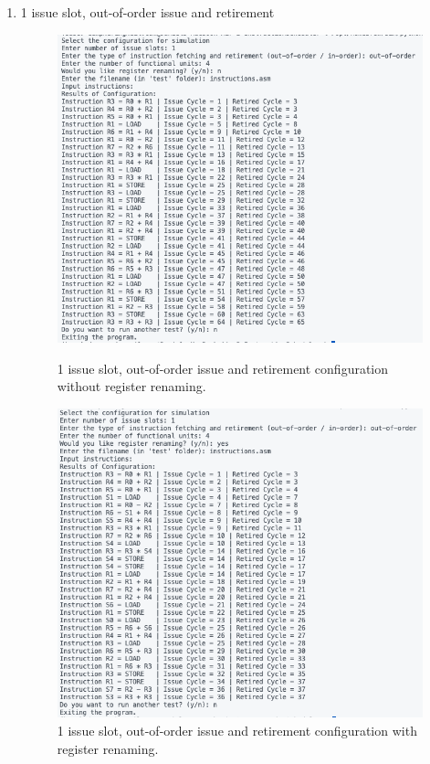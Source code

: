 \documentclass{article}
\begin{document}
\begin{enumerate}
    \item 1 issue slot, out-of-order issue and retirement 
    \begin{figure}[H]
        \centering 
        \begin{minipage}[t]{0.45\textwidth}
            \centering
            \includegraphics[width=\textwidth]{Images/Config2.png}
            \caption{1 issue slot, out-of-order issue and retirement configuration without register renaming.}
        \end{minipage}
        \hfill
        \begin{minipage}[t]{0.45\textwidth}
            \centering 
            \includegraphics[width=\textwidth]{Images/Config2_Renaming.png}
            \caption{1 issue slot, out-of-order issue and retirement configuration with register renaming.}
        \end{minipage}
    \end{figure}


\end{enumerate}
\end{document}
